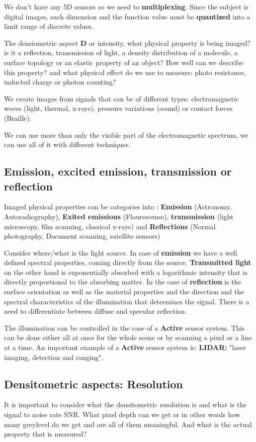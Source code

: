 We don't have any 5D sensors so we need to \textbf{multiplexing}. Since the subject is digital images, each dimension and the function value must be \textbf{quantized} into a limit range of discrete values. 

The densiometric aspect \textbf{D} or intensity, what physical property is being imaged? is it a reflection, transmission of light, a density distribution of a molecule, a surface topology or an elastic property of an object? How well can we describe this property? and what physical effect do we use to measure: photo resistance, inducted charge or photon counting? 

We create images from signals that can be of different types: electromagnetic waves (light, thermal, x-rays), pressure variations (sound) or contact forces (Braille).

We can use more than only the visible part of the electromagnetic spectrum, we can use all of it with different techniques. 

\subsection*{Emission, excited emission, transmission or reflection}
Imaged physical properties can be categories into : \textbf{Emission} (Astronomy, Autoradiography), \textbf{Exited emissions} (Flourescense), \textbf{transmission} (light microscopy, film scanning, classical x-rays) and \textbf{Reflections} (Normal photography, Document scanning, satellite sensors)

Consider where/what is the light source. In case of \textbf{emission} we have a well defined spectral properties, coming directly from the source. \textbf{Transmitted light} on the other hand is exponentially absorbed with a logarithmic intensity that is directly proportional to the absorbing matter. In the case of \textbf{reflection} is the surface orientation as well as the material properties and the direction and the spectral characteristics of the illumination that determines the signal. There is a need to differentiate between diffuse and specular reflection. 

The illumination can be controlled in the case of a \textbf{Active} sensor system. This can be done either all at once for the whole scene or by scanning a pixel or a line at a time. An important example of a \textbf{Active} sensor system is: \textbf{LIDAR:} "laser imaging, detection and ranging".

\subsection*{Densitometric aspects: Resolution}
It is important to consider what the densitometric resolution is and what is the signal to noise rate SNR. What pixel depth can we get or in other words how many greylevel do we get and are all of them meaningful. And what is the actual property that is measured? 

